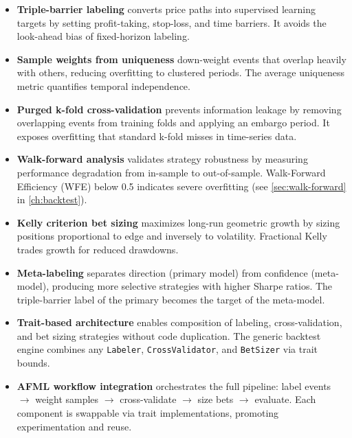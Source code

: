 \begin{itemize}
    \item \textbf{Triple-barrier labeling} converts price paths into
      supervised learning targets by setting profit-taking, stop-loss,
      and time barriers. It avoids the look-ahead bias of fixed-horizon
      labeling.

    \item \textbf{Sample weights from uniqueness} down-weight events
      that overlap heavily with others, reducing overfitting to
      clustered periods. The average uniqueness metric quantifies
      temporal independence.

    \item \textbf{Purged k-fold cross-validation} prevents information
      leakage by removing overlapping events from training folds and
      applying an embargo period. It exposes overfitting that standard
      k-fold misses in time-series data.

    \item \textbf{Walk-forward analysis} validates strategy robustness
      by measuring performance degradation from in-sample to
      out-of-sample. Walk-Forward Efficiency (WFE) below 0.5 indicates
      severe overfitting (see \cref{sec:walk-forward} in
      \cref{ch:backtest}).

    \item \textbf{Kelly criterion bet sizing} maximizes long-run
      geometric growth by sizing positions proportional to edge and
      inversely to volatility. Fractional Kelly trades growth for
      reduced drawdowns.

    \item \textbf{Meta-labeling} separates direction (primary model)
      from confidence (meta-model), producing more selective strategies
      with higher Sharpe ratios. The triple-barrier label of the
      primary becomes the target of the meta-model.

    \item \textbf{Trait-based architecture} enables composition of
      labeling, cross-validation, and bet sizing strategies without
      code duplication. The generic backtest engine combines any
      \texttt{Labeler}, \texttt{CrossValidator}, and \texttt{BetSizer}
      via trait bounds.

    \item \textbf{AFML workflow integration} orchestrates the full
      pipeline: label events $\to$ weight samples $\to$ cross-validate
      $\to$ size bets $\to$ evaluate. Each component is swappable via
      trait implementations, promoting experimentation and reuse.
\end{itemize}

